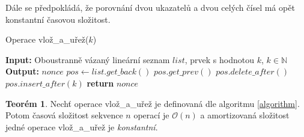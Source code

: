 \documentclass[a4paper, 12pt]{article}
\theoremstyle{definition}
\theoremstyle{definition}
\newtheorem{theorem}{Teorém}[section]
\theoremstyle{definition}
\theoremstyle{remark}
\theoremstyle{remark}
\theoremstyle{remark}
\theoremstyle{remark}
\begin{document}
Dále se předpokládá, že porovnání dvou ukazatelů a dvou celých čísel má opět konstantní časovou složitost.

\begin{algorithm}
\label{algorithm}
        \caption{Operace {\selectfont vlož\_a\_uřež}($k$)}\label{euclid}
        \begin{algorithmic}[1]
        \State \textbf{Input:} Oboustranně vázaný lineární seznam $list$, prvek s hodnotou $k$, $k \in \mathbb{N}$
        \State \textbf{Output:} $nonce$
            \State$pos \gets list.get\_back()$
                \State $pos.get\_prev()$
                \State $pos.delete\_after()$
            \EndWhile
            \State $pos.insert\_after(k)$
            \State \textbf{return} $nonce$
            \EndProcedure
        \end{algorithmic}
\end{algorithm}

\begin{theorem}
    Nechť operace {\selectfont vlož\_a\_uřež} je definovaná dle algoritmu \ref{algorithm}. Potom časová složitost sekvence $n$ operací je $\mathcal{O}(n)$ a amortizovaná složitost jedné operace {\selectfont vlož\_a\_uřež} je \textit{konstantní}.
\end{theorem}
\end{document}
